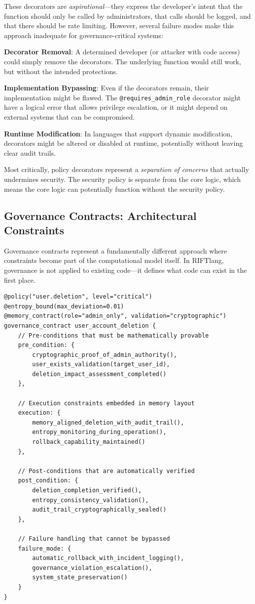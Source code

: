 These decorators are \textit{aspirational}—they express the developer's intent that the function should only be called by administrators, that calls should be logged, and that there should be rate limiting. However, several failure modes make this approach inadequate for governance-critical systems:

\textbf{Decorator Removal}: A determined developer (or attacker with code access) could simply remove the decorators. The underlying function would still work, but without the intended protections.

\textbf{Implementation Bypassing}: Even if the decorators remain, their implementation might be flawed. The \texttt{@requires\_admin\_role} decorator might have a logical error that allows privilege escalation, or it might depend on external systems that can be compromised.

\textbf{Runtime Modification}: In languages that support dynamic modification, decorators might be altered or disabled at runtime, potentially without leaving clear audit trails.

Most critically, policy decorators represent a \textit{separation of concerns} that actually undermines security. The security policy is separate from the core logic, which means the core logic can potentially function without the security policy.

\subsection{Governance Contracts: Architectural Constraints}

Governance contracts represent a fundamentally different approach where constraints become part of the computational model itself. In RIFTlang, governance is not applied to existing code—it defines what code can exist in the first place.

\begin{lstlisting}[language=rift, caption=RIFTlang Governance Contract Approach]
@policy("user.deletion", level="critical")
@entropy_bound(max_deviation=0.01)
@memory_contract(role="admin_only", validation="cryptographic")
governance_contract user_account_deletion {
    // Pre-conditions that must be mathematically provable
    pre_condition: {
        cryptographic_proof_of_admin_authority(),
        user_exists_validation(target_user_id),
        deletion_impact_assessment_completed()
    },
    
    // Execution constraints embedded in memory layout
    execution: {
        memory_aligned_deletion_with_audit_trail(),
        entropy_monitoring_during_operation(),
        rollback_capability_maintained()
    },
    
    // Post-conditions that are automatically verified
    post_condition: {
        deletion_completion_verified(),
        entropy_consistency_validation(),
        audit_trail_cryptographically_sealed()
    },
    
    // Failure handling that cannot be bypassed
    failure_mode: {
        automatic_rollback_with_incident_logging(),
        governance_violation_escalation(),
        system_state_preservation()
    }
}
\end{lstlisting}

